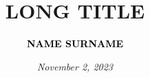 \author[NAME SURNAME]{\textcolor{black}{\bfseries NAME SURNAME}}
\title{\LARGE LONG TITLE}
\newcommand{\myDate}{November 2, 2023}

\date{\vspace{-25mm}\scriptsize{\textit{\myDate}}}
